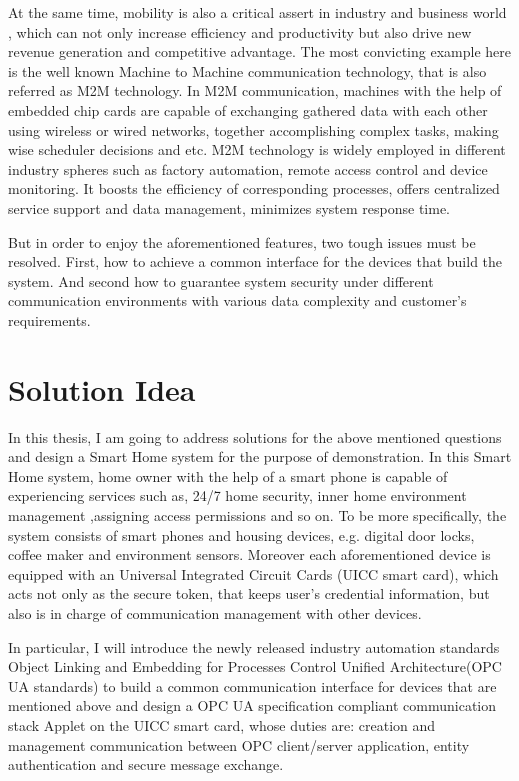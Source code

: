 At the same time, mobility is also a critical assert in industry and business world , which can not only increase efficiency and productivity but also drive new revenue generation and competitive advantage. The most convicting example here is the well known Machine to Machine communication technology, that is also referred as M2M technology. In M2M communication, machines  with the help of embedded chip cards are capable of  exchanging gathered data with each other using wireless or wired networks, together accomplishing complex tasks, making wise scheduler decisions and etc. M2M technology is widely employed in different industry spheres such as factory automation, remote access control and device monitoring. It boosts the efficiency of corresponding processes, offers centralized service support and data management, minimizes system response time.

But in order to enjoy the aforementioned features, two tough issues must be resolved. First, how to achieve a common interface for the devices that build the system.  And second how to guarantee system security under different communication environments with various data complexity and customer's requirements.

\section{Solution Idea}\label{secSolutionIdea}
In this  thesis, I am going to address solutions for the above mentioned questions and design a Smart Home system for the purpose of demonstration. In this Smart Home system, home owner with the help of a smart phone is capable of experiencing services such as, 24/7 home security, inner home environment management ,assigning access permissions and so on. To be more specifically, the system consists of smart phones and housing devices, e.g. digital door locks, coffee maker and environment sensors. Moreover each aforementioned device is equipped with an Universal Integrated Circuit Cards (UICC smart card), which acts not only as the secure token, that keeps user's credential information, but also is in charge of communication management with other devices.

In particular, I will introduce the newly released industry automation standards Object Linking and Embedding for Processes Control Unified Architecture(OPC UA standards) to build a common communication interface for devices that are mentioned above and design a OPC UA specification compliant communication stack Applet on the UICC smart card, whose duties are: creation and management communication between OPC client/server application, entity authentication and secure message exchange.

